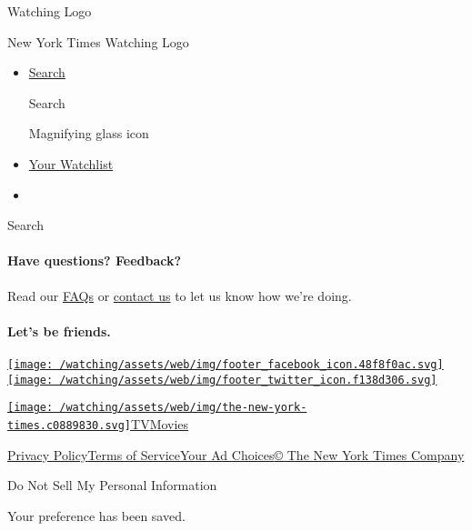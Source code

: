 \href{/watching}{}

Watching Logo

New York Times Watching Logo

\begin{itemize}
\item
  \href{/watching/search}{Search}

  Search

  Magnifying glass icon
\item
  \href{/watching/watchlist}{Your Watchlist}
\item
\end{itemize}

Search

\hypertarget{have-questions-feedback}{%
\paragraph{Have questions? Feedback?}\label{have-questions-feedback}}

Read our
\href{//www.nytimes3xbfgragh.onion/2017/01/10/watching/faq.html}{FAQs}
or \href{mailto:watchingcare@NYTimes.com}{contact us} to let us know how
we're doing.

\hypertarget{lets-be-friends}{%
\paragraph{Let's be friends.}\label{lets-be-friends}}

\href{https://www.facebookcorewwwi.onion/nytwatching/}{\texttt{[image: /watching/assets/web/img/footer\_facebook\_icon.48f8f0ac.svg]}}\href{https://twitter.com/watching}{\texttt{[image: /watching/assets/web/img/footer\_twitter\_icon.f138d306.svg]}}

\href{//www.nytimes3xbfgragh.onion}{\texttt{[image: /watching/assets/web/img/the-new-york-times.c0889830.svg]}}\href{//www.nytimes3xbfgragh.onion/section/arts/television}{TV}\href{//www.nytimes3xbfgragh.onion/section/movies}{Movies}

\href{//www.nytimes3xbfgragh.onion/content/help/rights/privacy/policy/privacy-policy.html}{Privacy
Policy}\href{//www.nytimes3xbfgragh.onion/content/help/rights/terms/terms-of-service.html}{Terms
of
Service}\href{//www.nytimes3xbfgragh.onion/content/help/rights/privacy/policy/privacy-policy.html\#pp}{Your
Ad Choices}\href{http://www.nytco.com/}{© The New York Times Company}

Do Not Sell My Personal Information

Your preference has been saved.
